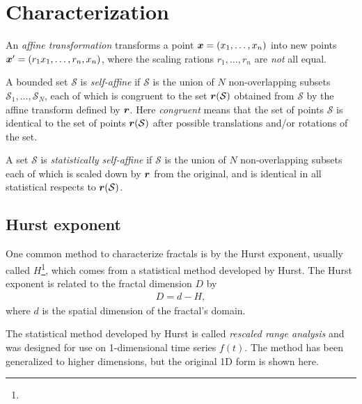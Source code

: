 \chapter{Characterization}

An \emph{affine transformation} transforms a point $\boldsymbol{x} = (x_1, \dots, x_n)$ into new points $\boldsymbol{x}' = (r_1x_1, \dots, r_n, x_n)$, where the scaling rations $r_1, \dots, r_n$ are \emph{not} all equal.

A bounded set $\mathcal{S}$ is \emph{self-affine} if $\mathcal{S}$ is the union of $N$ non-overlapping subsets $\mathcal{S}_1, \dots, \mathcal{S}_N$, each of which is congruent to the set $\boldsymbol{r}(\mathcal{S})$ obtained from $\mathcal S$ by the affine transform defined by $\boldsymbol{r}$. Here \emph{congruent} means that the set of points $\mathcal{S}$ is identical to the set of points $\boldsymbol{r}(\mathcal{S})$ after possible translations and/or rotations of the set\cite{feder1988fractals}.

A set $\mathcal{S}$ is \emph{statistically self-affine} if $\mathcal{S}$ is the union of $N$ non-overlapping subsets each of which is scaled down by $\boldsymbol{r}$ from the original, and is identical in all statistical respects to $\boldsymbol{r}(\mathcal{S})$.

\section{Hurst exponent}

One common method to characterize fractals is by the Hurst exponent, usually called $H$\footnote{}, which comes from a statistical method developed by Hurst\cite{hurst1965longterm}\cite{hurst1951longterm}. The Hurst exponent is related to the fractal dimension $D$ by
\begin{align*}
    D = d-H,
\end{align*}
where $d$ is the spatial dimension of the fractal's domain\cite{feder1988fractals}.

The statistical method developed by Hurst is called \emph{rescaled range analysis} and was designed for use on 1-dimensional time series $f(t)$. The method has been generalized to higher dimensions\cite{fan2013rescaled}, but the original 1D form is shown here.

